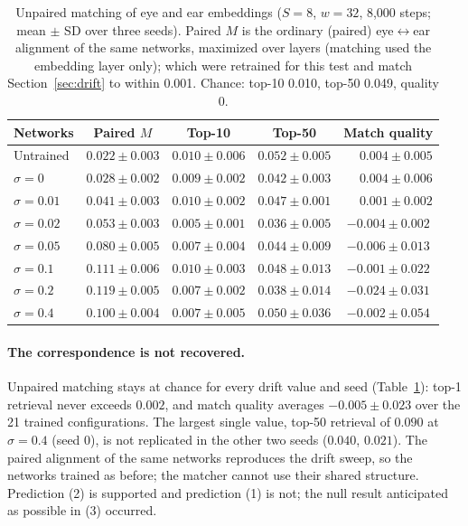 \documentclass[11pt]{article}
\newcommand{\lr}{\ensuremath{\leftrightarrow}}
\begin{document}
\begin{table}[t]
  \centering
  \small
  \caption{Unpaired matching of eye and ear embeddings ($S=8$, $w=32$, 8{,}000 steps; mean $\pm$ SD over three seeds). Paired $M$ is the ordinary (paired) eye\lr{}ear alignment of the same networks, maximized over layers (matching used the embedding layer only); which were retrained for this test and match Section~\ref{sec:drift} to within 0.001. Chance: top-10 0.010, top-50 0.049, quality 0.}
  \label{tab:unpaired}
  \begin{tabular}{lcccc}
    \toprule
    Networks & Paired $M$ & Top-10 & Top-50 & Match quality \\
    \midrule
    Untrained         & $0.022\pm0.003$ & $0.010\pm0.006$ & $0.052\pm0.005$ & $\phantom{-}0.004\pm0.005$ \\
    $\sigma=0$        & $0.028\pm0.002$ & $0.009\pm0.002$ & $0.042\pm0.003$ & $\phantom{-}0.004\pm0.006$ \\
    $\sigma=0.01$     & $0.041\pm0.003$ & $0.010\pm0.002$ & $0.047\pm0.001$ & $\phantom{-}0.001\pm0.002$ \\
    $\sigma=0.02$     & $0.053\pm0.003$ & $0.005\pm0.001$ & $0.036\pm0.005$ & $-0.004\pm0.002$ \\
    $\sigma=0.05$     & $0.080\pm0.005$ & $0.007\pm0.004$ & $0.044\pm0.009$ & $-0.006\pm0.013$ \\
    $\sigma=0.1$      & $0.111\pm0.006$ & $0.010\pm0.003$ & $0.048\pm0.013$ & $-0.001\pm0.022$ \\
    $\sigma=0.2$      & $0.119\pm0.005$ & $0.007\pm0.002$ & $0.038\pm0.014$ & $-0.024\pm0.031$ \\
    $\sigma=0.4$      & $0.100\pm0.004$ & $0.007\pm0.005$ & $0.050\pm0.036$ & $-0.002\pm0.054$ \\
    \bottomrule
  \end{tabular}
\end{table}

\paragraph{The correspondence is not recovered.} Unpaired matching stays at chance for every drift value and seed (Table~\ref{tab:unpaired}): top-1 retrieval never exceeds $0.002$, and match quality averages $-0.005\pm0.023$ over the 21 trained configurations. The largest single value, top-50 retrieval of $0.090$ at $\sigma=0.4$ (seed 0), is not replicated in the other two seeds ($0.040$, $0.021$). The paired alignment of the same networks reproduces the drift sweep, so the networks trained as before; the matcher cannot use their shared structure. Prediction (2) is supported and prediction (1) is not; the null result anticipated as possible in (3) occurred.
\end{document}
